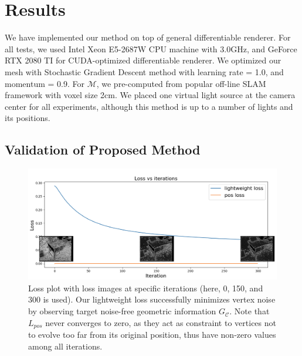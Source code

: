 \section{Results}
We have implemented our method on top of general differentiable renderer\cite{ravi2020accelerating}. 
For all tests, we used Intel Xeon E5-2687W CPU machine with 3.0GHz, and GeForce RTX 2080 TI for CUDA-optimized differentiable renderer. 
We optimized our mesh with Stochastic Gradient Descent method with learning rate = 1.0, and momentum = 0.9. 
For $\mathcal{M}$, we pre-computed from popular off-line SLAM framework \cite{zhou2018open3d} with voxel size 2cm.
We placed one virtual light source at the camera center for all experiments, although this method is up to a number of lights and its positions.


\subsection{Validation of Proposed Method}


\begin{figure}
    \includegraphics[width=\columnwidth]{figures/4_result_loss_plot_with_images.png}
    \caption{Loss plot with loss images at specific iterations (here, 0, 150, and 300 is used). Our lightweight loss successfully minimizes vertex noise by observing target noise-free geometric information $G_\mathcal{C}$. Note that $L_{pos}$ never converges to zero, as they act as constraint to vertices not to evolve too far from its original position, thus have non-zero values among all iterations.}
    \label{fig:loss_plot_with_images}
\end{figure}


